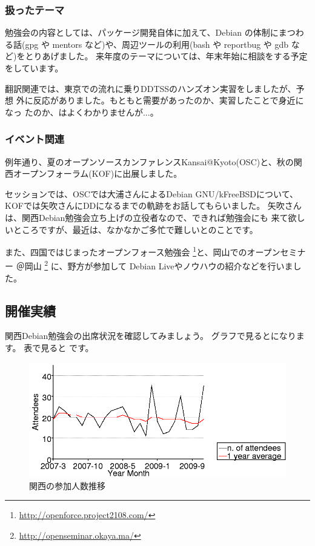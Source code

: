 \documentclass[mingoth,a4paper]{jsarticle}
\begin{document}
\subsubsection{扱ったテーマ}

勉強会の内容としては、パッケージ開発自体に加えて、Debian の体制にまつわ
る話(gpg や mentors など)や、周辺ツールの利用(bash や reportbug や gdb
など)をとりあげました。
来年度のテーマについては、年末年始に相談をする予定をしています。

翻訳関連では、東京での流れに乗りDDTSSのハンズオン実習をしましたが、予想
外に反応がありました。もともと需要があったのか、実習したことで身近になっ
たのか、はよくわかりませんが...。

\subsubsection{イベント関連}
例年通り、夏のオープンソースカンファレンスKansai@Kyoto(OSC)と、秋の関
西オープンフォーラム(KOF)に出展しました。

セッションでは、OSCでは大浦さんによるDebian GNU/kFreeBSDについて、
KOFでは矢吹さんにDDになるまでの軌跡をお話してもらいました。
矢吹さんは、関西Debian勉強会立ち上げの立役者なので、できれば勉強会にも
来て欲しいところですが、最近は、なかなかご多忙で難しいとのことです。

また、四国ではじまったオープンフォース勉強会 \footnote{
\url{http://openforce.project2108.com/}}と、岡山でのオープンセミナー
＠岡山 \footnote{\url{http://openseminar.okaya.ma/}} に、野方が参加して
Debian Liveやノウハウの紹介などを行いました。

\subsection{開催実績}

関西Debian勉強会の出席状況を確認してみましょう。
グラフで見るとになります。
表で見ると です。

\begin{figure}[h]
 \begin{center}
  \includegraphics[width=1\hsize]{image200912/kansai.png}
 \end{center}
\caption{関西の参加人数推移}
\label{fig:kansaipeoplechart}
\end{figure}
\end{document}
